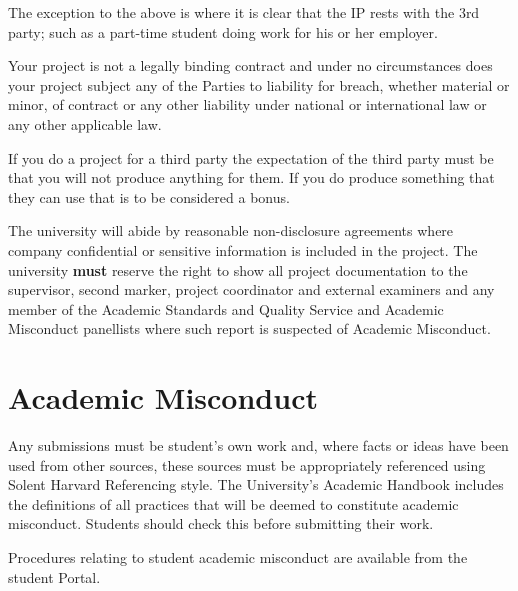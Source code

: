 The exception to the above is where it is clear that the IP rests with the 3rd party; such as a part-time student doing work for his or her employer.

\begin{tcolorbox}
    Your project is not a legally binding contract and under no circumstances does your project subject any of the Parties to liability for breach, whether material or minor, of contract or any other liability under national or international law or any other applicable law.
\end{tcolorbox}

If you do a project for a third party the expectation of the third party must be that you will not produce anything for them. If you do produce something that they can use that is to be considered a bonus.

The university will abide by reasonable non-disclosure agreements where company confidential or sensitive information is included in the project. The university \textbf{must} reserve the right to show all project documentation to the supervisor, second marker, project coordinator and external examiners and any member of the Academic Standards and Quality Service and Academic Misconduct panellists where such report is suspected of Academic Misconduct.

\section{Academic Misconduct}

Any submissions must be student’s own work and, where facts or ideas have been used from other sources, these sources must be appropriately referenced using Solent Harvard Referencing style. The University’s Academic Handbook includes the definitions of all practices that will be deemed to constitute academic misconduct. Students should check this before submitting their work.

Procedures relating to student academic misconduct are available from the student Portal.